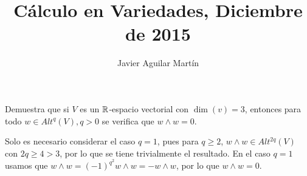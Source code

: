 \documentclass[twoside]{article}
\begin{document}
\title{Cálculo en Variedades, Diciembre de 2015}
\author{Javier Aguilar Martín}
\maketitle


\begin{ejercicio}{1}
Demuestra que si $V$ es un $\mathbb{R}$-espacio vectorial con $\dim(v)=3$, entonces para todo $w\in Alt^q(V), q>0$ se verifica que $w\land w=0$.
\end{ejercicio}
\begin{solucion}
Solo es necesario considerar el caso $q=1$, pues para $q\geq 2$, $w\land w\in Alt^{2q}(V)$ con $2q\geq 4>3$, por lo que se tiene trivialmente el resultado. En el caso $q=1$ usamos que $w\land w=(-1)^{q^2}w\land w=-w\land w$, por lo que $w\land w=0$.


\end{solucion}

\newpage

\begin{ejercicio}{2}

\end{ejercicio}
\begin{solucion}

\end{solucion}
\newpage

\begin{ejercicio}{3}

\end{ejercicio}
\begin{solucion}

\end{solucion}
\newpage

\begin{ejercicio}{4}

\end{ejercicio}
\begin{solucion}

\end{solucion}
\end{document}
